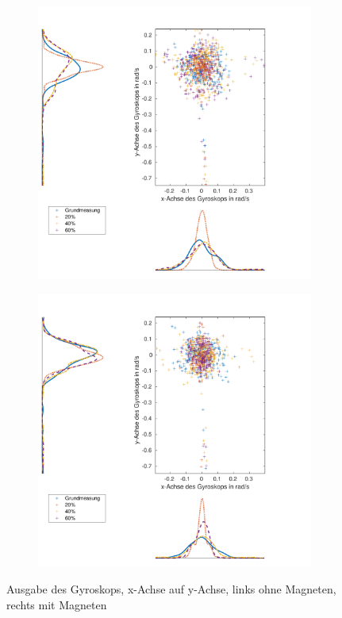 \begin{figure}[tb]
	\centering
	\begin{adjustwidth}{-0.2\linewidth}{-0.2\linewidth}
	\begin{subfigure}[c]{.5\linewidth}
		\centering
		\includegraphics[width=\linewidth]{Bilder/Gyr_Grund_20_40_60_ohneM.pdf}
		\vspace{5pt}
	\end{subfigure}
	\hfill
	\begin{subfigure}[c]{.5\linewidth}
		\centering
		\includegraphics[width=\linewidth]{Bilder/Gyr_Grund_20_40_60_mitM.pdf}
		\vspace{5pt}
	\end{subfigure}
	\end{adjustwidth}
	\caption{Ausgabe des Gyroskops, x-Achse auf y-Achse, links ohne Magneten, rechts mit Magneten}\label{Gyr}
\end{figure}
